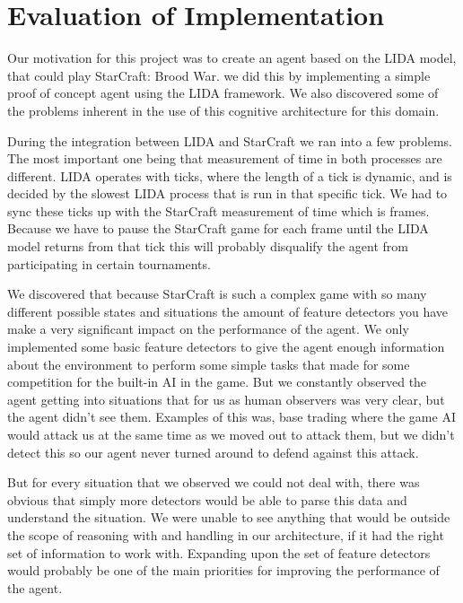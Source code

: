 \section{Evaluation of Implementation}
\label{sec:evalimp}
Our motivation for this project was to create an agent based on the LIDA model, that could play StarCraft: Brood War. we did this by implementing a simple proof of concept agent using the LIDA framework. We also discovered some of the problems inherent in the use of this cognitive architecture for this domain.

During the integration between LIDA and StarCraft we ran into a few problems. The most important one being that measurement of time in both processes are different. LIDA operates with ticks, where the length of a tick is dynamic, and is decided by the slowest LIDA process that is run in that specific tick. We had to sync these ticks up with the StarCraft measurement  of time which is frames. Because we have to pause the StarCraft game for each frame until the LIDA model returns from that tick this will probably disqualify the agent from participating in certain tournaments.

We discovered that because StarCraft is such a complex game with so many different possible states and situations the amount of feature detectors you have make a very significant impact on the performance of the agent. We only implemented some basic feature detectors to give the agent enough information about the environment to perform some simple tasks that made for some competition for the built-in AI in the game. But we constantly observed the agent getting into situations that for us as human observers was very clear, but the agent didn't see them. Examples of this was, base trading where the game AI would attack us at the same time as we moved out to attack them, but we didn't detect this so our agent never turned around to defend against this attack.

But for every situation that we observed we could not deal with, there was obvious that simply more detectors would be able to parse this data and understand the situation. We were unable to see anything that would be outside the scope of reasoning with and handling in our architecture, if it had the right set of information to work with. Expanding upon the set of feature detectors would probably be one of the main priorities for improving the performance of the agent.

